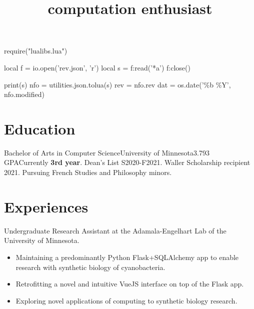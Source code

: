 \documentclass{moderncv}
\title{computation enthusiast}
\newcommand{\comment}[1]{}
\begin{document}
\begin{luacode}
require("lualibs.lua")

local f = io.open('rev.json', 'r')
local s = f:read('*a')
f:close()

print(s)
nfo = utilities.json.tolua(s)
rev = nfo.rev
dat = os.date('\%b \%Y', nfo.modified)
\end{luacode}

\newcommand{\githash}
{
  \href{https://github.com/tnytown/website/blob/\luadirect{tex.sprint(rev)}/cv.tex}
  {\texttt{\luadirect{tex.sprint(rev)}}}}
\newcommand{\lastmodified}{\luadirect{tex.sprint(dat)}}

\makecvtitle{}
\vspace*{-15mm} %

\section{Education}
{
  Bachelor of Arts in Computer Science}{University of Minnesota}{}{3.793 GPA}{Currently \textbf{3rd year}. Dean's List S2020-F2021. Waller Scholarship recipient 2021. Pursuing French Studies and Philosophy minors.
}

\comment{
\subsection{selected CSCI coursework}
\cvlistitem{CSCI2021, Machine Architecture and Organization}
\cvlistitem{CSCI2041, Advanced Programming Principles}
\cvlistitem{CSCI2033, Elementary Computational Linear Algebra}
\cvlistitem{CSCI5551, Introduction to Intelligent Robotic Systems (in-progress)}
\cvlistitem{CSCI4611, Programming Interactive Computer Graphics and Games (in-progress)}
}

\section{Experiences}
{
  Undergraduate Research Assistant at the Adamala-Engelhart Lab of the University of Minnesota.
  \begin{itemize}[label=\rightarrow,noitemsep]
  \item Maintaining a predominantly Python Flask+SQLAlchemy app to enable research with synthetic biology of cyanobacteria.
  \item Retrofitting a novel and intuitive VueJS interface on top of the Flask app.
  \item Exploring novel applications of computing to synthetic biology research.
  \end{itemize}
}
   
\end{document}
